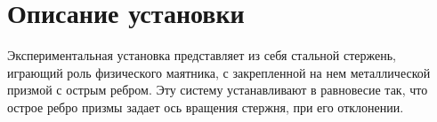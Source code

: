 \documentclass[a4paper,14pt]{extarticle}
\begin{document}
	\section{Описание установки}
	Экспериментальная установка представляет из себя стальной стержень, играющий роль физического маятника, с закрепленной на нем металлической призмой с острым ребром. Эту систему устанавливают в равновесие так, что острое ребро призмы задает ось вращения стержня, при его отклонении.  	   
\end{document}
